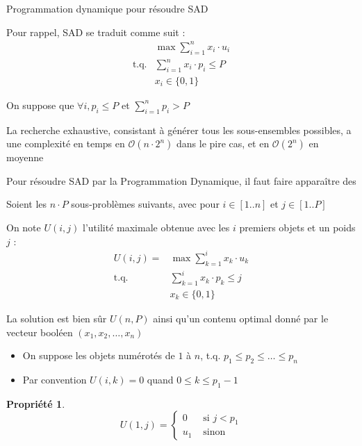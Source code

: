 \documentclass[aspectratio=1610,francais,envcountsect]{beamer}
\newtheorem{property}[theorem]{Propriété}
\begin{document}
\begin{frame}[allowframebreaks]{Programmation dynamique pour résoudre
    SAD}

  Pour rappel, SAD se traduit comme suit :
  \begin{align*}
    & \max \sum_{i=1}^nx_i\cdot u_i\\
    \text{t.q.} & \sum_{i=1}^nx_i\cdot p_i\leq P\\
    & x_i\in\{0,1\}
  \end{align*}

  On suppose que $\forall i, p_i \leq P$ et $\sum_{i=1}^np_i > P$

  \bigskip
  
  La recherche exhaustive, consistant à générer tous les
  sous-ensembles possibles, a une complexité en temps en
  $\mathcal{O}(n\cdot 2^n)$ dans le pire cas, et en $\mathcal{O}(2^n)$
  en moyenne

  \bigskip

  Pour résoudre SAD par la Programmation Dynamique, il faut faire
  apparaître des 
  
  \framebreak
  
  Soient les $n\cdot P$ sous-problèmes suivants, avec pour
  $i\in[1..n]$ et $j\in[1..P]$

  \begin{definition}
    On note $U(i, j)$ l’utilité maximale obtenue avec les $i$ premiers
    objets et un poids $j$ :
    \begin{align*}
      U(i,j) = & \max \sum_{k=1}^ix_k\cdot u_k\\
      \text{t.q.} & \sum_{k=1}^ix_k\cdot p_k\leq j\\
               & x_k\in\{0,1\}
    \end{align*}
  \end{definition}

  La solution est bien sûr $U(n, P)$ ainsi qu’un contenu optimal donné
  par le vecteur booléen $(x_1, x_2,\ldots , x_n)$

  \begin{itemize}
  \item On suppose les objets numérotés de $1$ à $n$, t.q.
    $p_1 \leq p_2 \leq \ldots \leq p_n$
  \item Par convention $U(i, k) = 0$ quand $0 \leq k \leq p_1 - 1$
  \end{itemize}

  \framebreak

  \begin{property}
    \begin{equation*}
      U(1,j) =
      \begin{cases}
        0 & \text{ si } j < p_1\\
        u_1 & \text{ sinon}
      \end{cases}
    \end{equation*}
  \end{property}


\end{frame}
\end{document}
